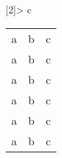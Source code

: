 \documentclass{article}
\begin{document}
\newcolumntype{h}[2]{>{%
\ifthenelse{%
\isodd{\value{rownum}}}%
{%
\color{#2}}%
{\color{#1}%
}%
}c}%

\begin{table}
\begin{tabular}{h{white}{black} h{white}{black} h{white}{black}}
a & b & c \\
a & b & c \\
a & b & c \\
a & b & c \\
a & b & c \\
a & b & c \\
\end{tabular}
\end{table}
\end{document}
